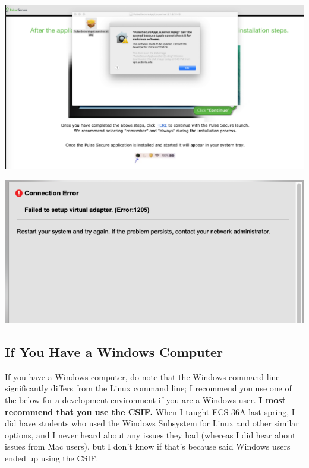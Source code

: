 \documentclass{article}
\begin{document}
\includegraphics[scale=0.35]{mac_issue_1}

\includegraphics[scale=0.45]{mac_issue_2}

\subsection{If You Have a Windows Computer}

If you have a Windows computer, do note that the Windows command line significantly differs from the Linux command line; I recommend you use one of the below for a development environment if you are a Windows user. \textbf{I most recommend that you use the CSIF.} When I taught ECS 36A last spring, I did have students who used the Windows Subsystem for Linux and other similar options, and I never heard about any issues they had (whereas I did hear about issues from Mac users), but I don't know if that's because said Windows users ended up using the CSIF.
\end{document}

